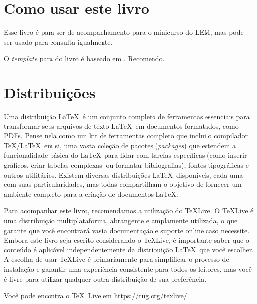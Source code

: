 \section{Como usar este livro}

Esse livro é para ser de acompanhamento para o minicurso do LEM, mas pode ser usado para consulta igualmente.

O \textit{template} para do livro é baseado em \cite{carauma}. Recomendo.

\section{Distribuições}

Uma distribuição \LaTeX\ é um conjunto completo de ferramentas essenciais para transformar seus arquivos de texto \LaTeX\ em documentos formatados, como PDFs. Pense nela como um kit de ferramentas completo que inclui o compilador \TeX/\LaTeX\ em si, uma vasta coleção de pacotes (\textit{packages}) que estendem a funcionalidade básica do \LaTeX\ para lidar com tarefas específicas (como inserir gráficos, criar tabelas complexas, ou formatar bibliografias), fontes tipográficas e outros utilitários.  Existem diversas distribuições \LaTeX\ disponíveis, cada uma com suas particularidades, mas todas compartilham o objetivo de fornecer um ambiente completo para a criação de documentos \LaTeX.

Para acompanhar este livro, recomendamos a utilização do \TeX Live. O \TeX Live é uma distribuição multiplataforma, abrangente e amplamente utilizada, o que garante que você encontrará vasta documentação e suporte online caso necessite.  Embora este livro seja escrito considerando o \TeX Live, é importante saber que o conteúdo é aplicável independentemente da distribuição \LaTeX\ que você escolher. A escolha de usar \TeX Live é primariamente para simplificar o processo de instalação e garantir uma experiência consistente para todos os leitores, mas você é livre para utilizar qualquer outra distribuição de sua preferência.

Você pode encontra o \TeX\ Live em \url{https://tug.org/texlive/}.




